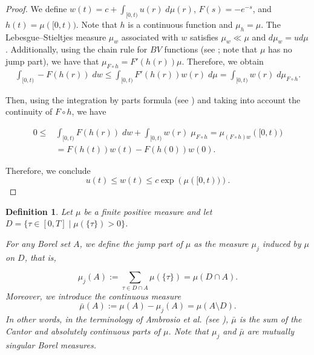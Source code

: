 \documentclass[a4paper,11pt]{amsart}
\theoremstyle{plain}
\newtheorem{defi}[thm]{Definition}
\theoremstyle{remark}
\numberwithin{equation}{section}
\begin{document}
\begin{proof}
	We define $w(t)= c+ \int_{[0,t)}u(r) \; d\mu(r)$, $F(s)=-e^{-s}$, and $h(t)=\mu([0,t))$. Note that $h$ is a continuous function and $\mu_h=\mu$.
	The Lebesgue--Stieltjes measure $\mu_{w}$ associated with $w$ satisfies $\mu_w\ll \mu$ and $d\mu_w=ud\mu$. Additionally, using the chain rule for $BV$ functions (see \cite[Th. 3.99]{LuigiAmbrosio1517}; note that $\mu$ has no jump part), we have that $\mu_{F\circ h}=F'\left( h(r)\right)\mu$. Therefore, we obtain
\begin{equation*}
    \begin{split}
	\int_{[0,t)}-F\left( h(r)\right)\; dw \leq \int_{[0,t)}F'\left( h(r)\right)w(r)\; d\mu
	= 	\int_{[0,t)}w(r)\; d\mu_{F\circ h}.
 \end{split}
\end{equation*}

 
Then, using the integration by parts formula (see \cite[Th. 14.1]{StanislawSaks}) and taking into account the continuity of $F\circ h$, we have  
 
\begin{equation*}
\begin{split}
	0\leq &\int_{[0,t)}F(h(r))\; dw+  \int_{[0,t)}w(r)\; \mu_{F\circ h}=
	\mu_{(F\circ h)w}([0,t))  \\
	&= F(h(t))w(t)-F(h(0))w(0).
    \end{split}
\end{equation*}
%
 
Therefore, we conclude
 $$u(t)\leq w(t)\leq c\exp\left( \mu([0,t))\right).$$
 
%
\end{proof}



\begin{defi}\label{mu_a}
	Let $\mu$ be a finite positive measure and let $D=\{\tau\in [0,T] \mid \mu(\{\tau\})>0\}$.
 
For any Borel set $A$, we define the \emph{jump part of} $\mu$ as the measure $\mu_j$ induced by $\mu$ on $D$, that is,
 
$$\mu_j(A):=\sum_{\tau\in D\cap A}\mu(\{\tau\})=\mu\left(D\cap A\right).$$
Moreover, we introduce the continuous measure 
$$\bar{\mu}\left(A\right):=\mu(A)-\mu_j\left(A \right)=\mu\left(A\setminus D \right).$$
In other words, in the terminology of Ambrosio et al. (see \cite{LuigiAmbrosio1517}), $\bar{\mu}$ is the sum of the Cantor and absolutely continuous parts of $\mu$. Note that $\mu_j$ and $\bar{\mu}$ are mutually singular Borel measures.
\end{defi}
\end{document}
